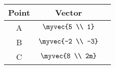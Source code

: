 \begin{tabular}[12pt]{ |c| c| c|} 
    \hline
    {Point} & {Vector} \\ 
    \hline
    A & $ \myvec{5 \\ 1} $ \\
    \hline 
    B & $ \myvec{-2 \\ -3} $  \\
    \hline
    C & $ \myvec{8 \\ 2m} $   \\
    \hline  
    \end{tabular}
